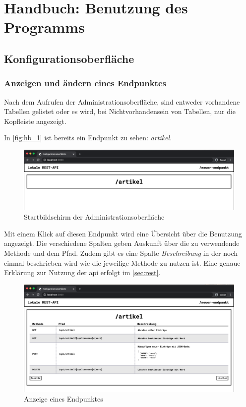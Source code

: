 \chapter{Handbuch: Benutzung des Programms} \label{chp:handbook}


\section{Konfigurationsoberfläche}
\subsection{Anzeigen und ändern eines Endpunktes}
Nach dem Aufrufen der Administrationsoberfläche, sind entweder vorhandene Tabellen gelistet oder es wird, bei Nichtvorhandensein von Tabellen, nur die Kopfleiste angezeigt. 

In \autoref{fig:hb_1} ist bereits ein Endpunkt zu sehen: \textit{artikel}. 

\begin{figure}[h]
    \centering
    \includegraphics[width=15cm]{figures/hb_1.png}    %
    \caption{Startbildschirm der Administrationsoberfläche}
    \label{fig:hb_1}
\end{figure}

Mit einem Klick auf diesen Endpunkt wird eine Übersicht über die Benutzung angezeigt. Die verschiedene Spalten geben Auskunft über die zu verwendende Methode und dem Pfad. Zudem gibt es eine Spalte \textit{Beschreibung} in der noch einmal beschrieben wird wie die jeweilige Methode zu nutzen ist. Eine genaue Erklärung zur Nutzung der \gls{api} erfolgt im \autoref{sec:rest}.

\begin{figure}[H]
    \centering
    \includegraphics[width=15cm]{figures/hb_2.png}    %
    \caption{Anzeige eines Endpunktes}
    \label{fig:hb_2}
\end{figure}

